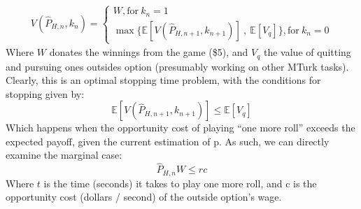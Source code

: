 \documentclass[a4paper,12pt]{article}
\begin{document}
\begin{align*}
  V(\hat{P}_{H,n}, k_n) =
 \begin{cases} W, \text{for} \ k_n = 1 \\
   \max \bigg\{ \mathbb{E}[V(\hat{P}_{H,n+1}, k_{n+1})] \ , \ \mathbb{E}[V_q]  \bigg\}, \text{for} \ k_n = 0
\end{cases}
\end{align*}
%
Where $W$ donates the winnings from the game (\$5), and $V_q$ the value of quitting and pursuing ones outsides option (presumably working on other MTurk tasks). Clearly, this is an optimal stopping time problem, with the conditions for stopping given by:
$$
\mathbb{E}[V(\hat{P}_{H,n+1}, k_{n+1})] \leq \mathbb{E}[V_q]
$$
Which happens when the opportunity cost of playing ``one more roll'' exceeds the expected payoff, given the current estimation of p. As such, we can directly examine the marginal case:
$$
\hat{P}_{H, n} W \leq rc
$$
Where $t$ is the time (seconds) it takes to play one more roll, and c is the opportunity cost (dollars / second) of the outside option's wage.




\end{document}

